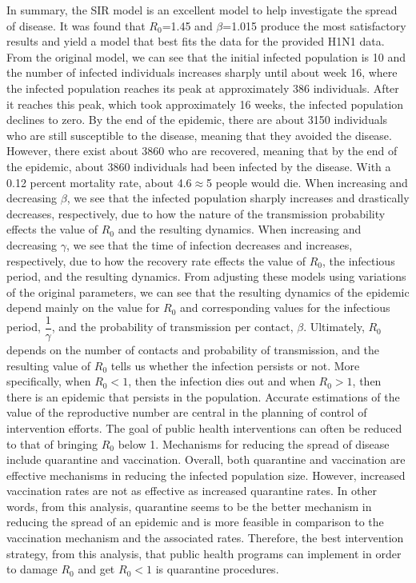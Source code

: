 \documentclass[12pt]{article}
\begin{document}
In summary, the SIR model is an excellent model to help investigate the spread of disease. It was found that $R_0$=1.45 and ${\beta}$=1.015 produce the most satisfactory results and yield a model that best fits the data for the provided H1N1 data. From the original model, we can see that the initial infected population is 10 and the number of infected individuals increases sharply until about week 16, where the infected population reaches its peak at approximately 386 individuals. After it reaches this peak, which took approximately 16 weeks, the infected population declines to zero. By the end of the epidemic, there are about 3150 individuals who are still susceptible to the disease, meaning that they avoided the disease. However, there exist about 3860 who are recovered, meaning that by the end of the epidemic, about 3860 individuals had been infected by the disease. With a 0.12 percent mortality rate, about 4.6$\approx$5 people would die. When increasing and decreasing ${\beta}$, we see that the infected population sharply increases and drastically decreases, respectively, due to how the nature of the transmission probability effects the value of $R_0$ and the resulting dynamics. When increasing and decreasing ${\gamma}$, we see that the time of infection decreases and increases, respectively, due to how the recovery rate effects the value of $R_0$, the infectious period, and the resulting dynamics. From adjusting these models using variations of the original parameters, we can see that the resulting dynamics of the epidemic depend mainly on the value for $R_0$ and corresponding values for the infectious period, $\dfrac{1}{\gamma}$, and the probability of transmission per contact, ${\beta}$. Ultimately, $R_0$ depends on the number of contacts and probability of transmission, and the resulting value of $R_0$ tells us whether the infection persists or not. More specifically, when $R_0<1$, then the infection dies out and when $R_0>1$, then there is an epidemic that persists in the population. Accurate estimations of the value of the reproductive number are central in the planning of control of intervention efforts. The goal of public health interventions can often be reduced to that of bringing $R_0$ below 1. Mechanisms for reducing the spread of disease include quarantine and vaccination. Overall, both quarantine and vaccination are effective mechanisms in reducing the infected population size. However, increased vaccination rates are not as effective as increased quarantine rates. In other words, from this analysis, quarantine seems to be the better mechanism in reducing the spread of an epidemic and is more feasible in comparison to the vaccination mechanism and the associated rates. Therefore, the best intervention strategy, from this analysis, that public health programs can implement in order to damage $R_0$ and get $R_0<1$ is quarantine procedures.
\end{document}
